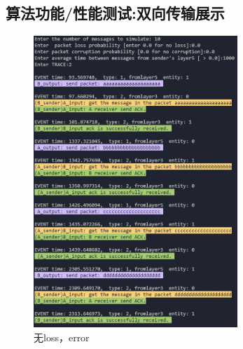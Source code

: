 \documentclass[UTF8,14pt]{article}
\numberwithin{figure}{section}
\begin{document}
\subsection{算法功能/性能测试:双向传输展示}
\vspace*{-0.5cm}
\begin{figure}[!htb]
      \centering
      \setlength{\abovecaptionskip}{0.cm}
      \includegraphics[width=7.70cm,height=11cm]{figures/result1.png}
      \caption{无loss，error}
\end{figure}
\end{document}
